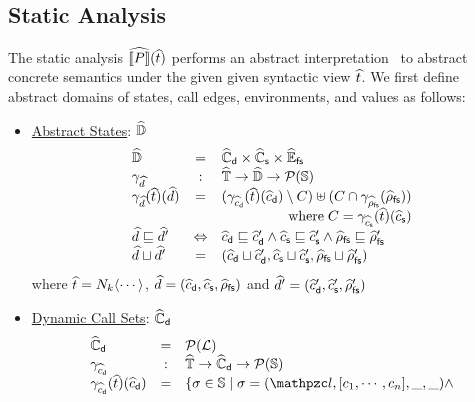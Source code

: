 \documentclass[10pt,conference]{IEEEtran}
\begin{document}
\subsection{Static Analysis}

The static analysis $\widehat{\llbracket{P}\rrbracket}(\widehat{t})$ performs an abstract
interpretation~\cite{ai1977, ai1992} to abstract concrete semantics under the
given given syntactic view $\widehat{t}$.  We first define abstract domains of
states, call edges, environments, and values as follows:
\begin{itemize}
  \item \underline{Abstract States}: $\widehat{\mathbb{D}}$
    \[
      \begin{array}{lcl}
        \aelemset &=& \adcallset \times \ascallset \times \afsenvset\\

        \aelemgamma &:& \atreeset \rightarrow \aelemset \rightarrow
        \powerset{\stset}\\

        \aelemgamma(\atree)(\aelem) &=&
        (\adcallgamma(\atree)(\adcall) \setminus C) \uplus
        (C \cap \afsenvgamma(\afsenv))\\
        \multicolumn{3}{r}{\text{where} \; C = \ascallgamma(\atree)(\ascall)}\\

        \aelem \order \aelem' &\Leftrightarrow&
        \adcall \order \adcall' \wedge
        \ascall \order \ascall' \wedge
        \afsenv \order \afsenv'\\

        \aelem \join \aelem' &=&
        (\adcall \join \adcall', \ascall \join \ascall', \afsenv \join \afsenv')\\
      \end{array}
    \]
    where $\widehat{t} = N_k \langle \cdots \rangle$, $\widehat{d} = (\widehat{c}_{\textsf{d}}, \widehat{c}_{\textsf{s}},
    \widehat{\rho}_{\textsf{fs}})$ and $\widehat{d}' = (\widehat{c}_{\textsf{d}}', \widehat{c}_{\textsf{s}}', \widehat{\rho}_{\textsf{fs}}')$

  \item \underline{Dynamic Call Sets}: $\widehat{\mathbb{C}}_{\textsf{d}}$
    \[
      \begin{array}{lcl}
        \adcallset &=& \powerset{\labset}\\

        \adcallgamma &:& \atreeset \rightarrow \adcallset \rightarrow
        \powerset{\stset}\\

        \adcallgamma(\atree)(\adcall) &=& \{ \st \in \stset \mid
          \st = (\lab, [\ctxt_1, \cdots, \ctxt_n], \_, \_) \wedge\\&&


\end{array}\]
\end{itemize}
\end{document}
